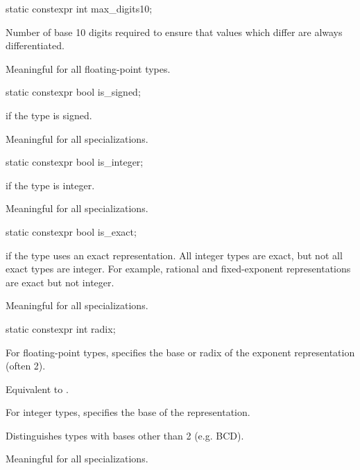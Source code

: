 %
\begin{itemdecl}
static constexpr int max_digits10;
\end{itemdecl}

\begin{itemdescr}
\pnum
Number of base 10 digits required to ensure that values which
differ are always differentiated.

\pnum
Meaningful for all floating-point types.
\end{itemdescr}

%
\begin{itemdecl}
static constexpr bool is_signed;
\end{itemdecl}

\begin{itemdescr}
\pnum
{} if the type is signed.

\pnum
Meaningful for all specializations.
\end{itemdescr}

%
\begin{itemdecl}
static constexpr bool is_integer;
\end{itemdecl}

\begin{itemdescr}
\pnum
{} if the type is integer.

\pnum
Meaningful for all specializations.
\end{itemdescr}

%
\begin{itemdecl}
static constexpr bool is_exact;
\end{itemdecl}

\begin{itemdescr}
\pnum
{} if the type uses an exact representation.
All integer types are exact, but not all exact types are integer.
For example, rational and fixed-exponent representations are exact but not integer.

\pnum
Meaningful for all specializations.
\end{itemdescr}

%
\begin{itemdecl}
static constexpr int radix;
\end{itemdecl}

\begin{itemdescr}
\pnum
For floating-point types, specifies the base or radix of the exponent representation
(often 2).
\begin{footnote}
Equivalent to .
\end{footnote}

\pnum
For integer types, specifies the base of the
representation.
\begin{footnote}
Distinguishes types with bases other than 2 (e.g.
BCD).
\end{footnote}

\pnum
Meaningful for all specializations.
\end{itemdescr}

